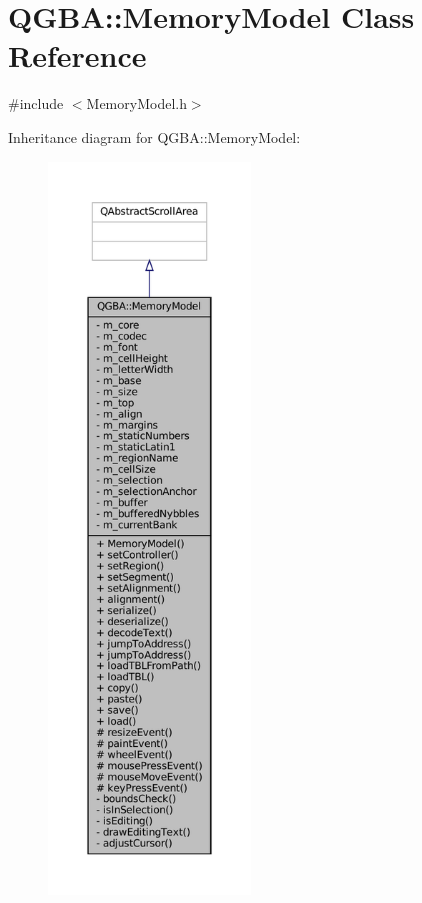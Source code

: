 \hypertarget{class_q_g_b_a_1_1_memory_model}{}\section{Q\+G\+BA\+:\+:Memory\+Model Class Reference}
\label{class_q_g_b_a_1_1_memory_model}


{\ttfamily \#include $<$Memory\+Model.\+h$>$}



Inheritance diagram for Q\+G\+BA\+:\+:Memory\+Model\+:
\nopagebreak
\begin{figure}[H]
\begin{center}
\leavevmode
\includegraphics[height=550pt]{class_q_g_b_a_1_1_memory_model__inherit__graph}
\end{center}
\end{figure}


